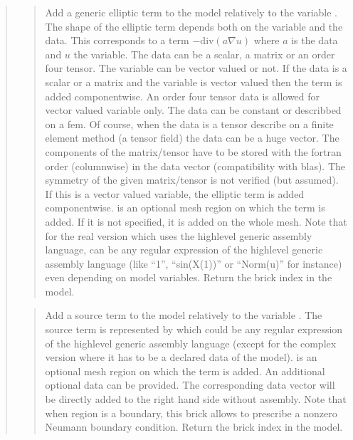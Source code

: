 \documentclass[a4paper,11pt,english]{sphinxmanual}
\begin{document}
\begin{quote}
\begin{quote}
Add a generic elliptic term to the model relatively to the variable .
The shape of the elliptic term depends both on the variable and the data.
This corresponds to a term
\(-\text{div}(a\nabla u)\)
where \(a\) is the data and \(u\) the variable. The data can be
a scalar,
a matrix or an order four tensor. The variable can be vector valued or
not. If the data is a scalar or a matrix and the variable is vector
valued then the term is added componentwise. An order four tensor data
is allowed for vector valued variable only. The data can be constant or
describbed on a fem. Of course, when the data is a tensor describe on a
finite element method (a tensor field) the data can be a huge vector.
The components of the matrix/tensor have to be stored with the fortran
order (columnwise) in the data vector (compatibility with blas). The
symmetry of the given matrix/tensor is not verified (but assumed). If
this is a vector valued variable, the elliptic term is added
componentwise.  is an optional mesh region on which the term is
added. If it is not specified, it is added on the whole mesh. Note that
for the real
version which uses the high\sphinxhyphen{}level generic assembly language, 
can be any regular expression of the high\sphinxhyphen{}level generic assembly
language (like “1”, “sin(X(1))” or “Norm(u)” for instance) even
depending on model variables. Return the
brick index in the model.
\end{quote}

\begin{quote}

Add a source term to the model relatively to the variable .
The source term is
represented by  which could be any regular expression of the
high\sphinxhyphen{}level generic assembly language (except for the complex version
where it has to be a declared data of the model).
 is an optional mesh region
on which the term is added. An additional optional data 
can be provided. The corresponding data vector will be directly added
to the right hand side without assembly. Note that when region is a
boundary, this brick allows to prescribe a nonzero Neumann boundary
condition. Return the brick index in the model.
\end{quote}


\end{quote}
\end{document}
